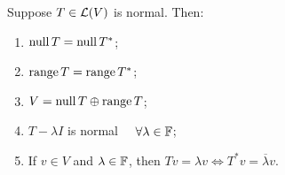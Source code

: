 \begin{thm}
  \label{thm: range, null space, and eigenvectors of a normal operator}
  Suppose $T\in \mathcal{L}(V)$ is normal. Then:
  \begin{enumerate}[label=\textbf{(\alph*)}]
    \item $\operatorname{null} T = \operatorname{null} T^*$;
    \item $\operatorname{range} T = \operatorname{range} T^*$;
    \item $V = \operatorname{null} T  \oplus \operatorname{range} T$;
    \item $T - \lambda I$ is normal $\quad \forall \lambda \in \mathbb{F}$;
    \item If $v \in V$ and $\lambda \in \mathbb{F}$, then $Tv = \lambda v \iff T^*v = \overline{\lambda} v$.
  \end{enumerate}
\end{thm}
